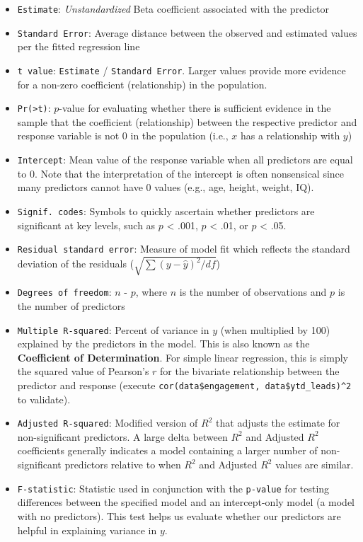 \documentclass[
]{book}
\providecommand{\tightlist}{%
  \setlength{\itemsep}{0pt}\setlength{\parskip}{0pt}}
\begin{document}
\begin{itemize}
\tightlist
\item
  \texttt{Estimate}: \emph{Unstandardized} Beta coefficient associated with the predictor
\item
  \texttt{Standard\ Error}: Average distance between the observed and estimated values per the fitted regression line
\item
  \texttt{t\ value}: \texttt{Estimate} / \texttt{Standard\ Error}. Larger values provide more evidence for a non-zero coefficient (relationship) in the population.
\item
  \texttt{Pr(\textgreater{}\textbar{}t\textbar{})}: \(p\)-value for evaluating whether there is sufficient evidence in the sample that the coefficient (relationship) between the respective predictor and response variable is not 0 in the population (i.e., \(x\) has a relationship with \(y\))
\item
  \texttt{Intercept}: Mean value of the response variable when all predictors are equal to 0. Note that the interpretation of the intercept is often nonsensical since many predictors cannot have 0 values (e.g., age, height, weight, IQ).
\item
  \texttt{Signif.\ codes}: Symbols to quickly ascertain whether predictors are significant at key levels, such as \(p\) \textless{} .001, \(p\) \textless{} .01, or \(p\) \textless{} .05.
\item
  \texttt{Residual\ standard\ error}: Measure of model fit which reflects the standard deviation of the residuals (\(\sqrt {\sum(y-\hat{y})^2 / df}\))
\item
  \texttt{Degrees\ of\ freedom}: \(n\) - \(p\), where \(n\) is the number of observations and \(p\) is the number of predictors
\item
  \texttt{Multiple\ R-squared}: Percent of variance in \(y\) (when multiplied by 100) explained by the predictors in the model. This is also known as the \textbf{Coefficient of Determination}. For simple linear regression, this is simply the squared value of Pearson's \(r\) for the bivariate relationship between the predictor and response (execute \texttt{cor(data\$engagement,\ data\$ytd\_leads)\^{}2} to validate).
\item
  \texttt{Adjusted\ R-squared}: Modified version of \(R^2\) that adjusts the estimate for non-significant predictors. A large delta between \(R^2\) and Adjusted \(R^2\) coefficients generally indicates a model containing a larger number of non-significant predictors relative to when \(R^2\) and Adjusted \(R^2\) values are similar.
\item
  \texttt{F-statistic}: Statistic used in conjunction with the \texttt{p-value} for testing differences between the specified model and an intercept-only model (a model with no predictors). This test helps us evaluate whether our predictors are helpful in explaining variance in \(y\).
\end{itemize}
\end{document}
